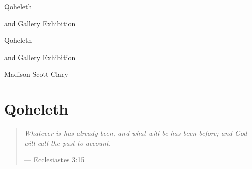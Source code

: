 \documentclass[11pt]{memoir}
\begin{document}
  \frontmatter

  \thispagestyle{empty}
  \null
  \vfill
  \begin{flushright}
    \DisplayFont Qoheleth

    \vspace{1ex}

    {\footnotesize and Gallery Exhibition}
  \end{flushright}
  \vfill
  \cleardoublepage

  \pagestyle{plain}

  \doublespacing

  \begin{flushright}
    \null
    \vfill
    {\Huge\DisplayFont Qoheleth}

    \vspace{1ex}

    {\Large\DisplayFont and Gallery Exhibition}

    \vfill

    {\Large\DisplayFont Madison Scott-Clary}
  \end{flushright}
  \thispagestyle{empty}

  \newpage

  

  \tableofcontents*
  \newpage
  \null
  \cleardoublepage

  \onehalfspacing


  \mainmatter

  \pagestyle{ourbook}

  \cleardoublepage
  \part*{Qoheleth}
  \null
  \thispagestyle{empty}
  \vfill
  \begin{quote}
    \emph{Whatever is has already been, and what will be has been \mbox{before;} and God will call the past to account.}

    --- Ecclesiastes 3:15
  \end{quote}
  \vfill
  
  
  
  

%  
%
%  
\end{document}
